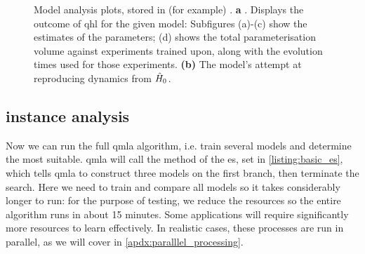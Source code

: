 \begin{figure}[H]
    \begin{center}
    \qquad
    \end{center}
    \caption[Model analysis plots]{
        Model analysis plots, stored in (for example) . 
        \textbf{a} . 
        Displays the outcome of \gls{qhl} for the given model:
        Subfigures (a)-(c) show the estimates of the parameters; 
        (d) shows the total parameterisation \gls{volume} against experiments trained upon, 
        along with the evolution times used for those experiments. 
        \textbf{(b)}  The model's attempt at reproducing dynamics from $\hat{H}_0$. 
    }
    \label{fig:model_analysis}
\end{figure}

\subsection{\Gls{instance} analysis}
Now we can run the full \gls{qmla} algorithm, i.e. train several models 
    and determine the most suitable. 
\gls{qmla} will call the  method of the  \gls{es},
    set in \cref{listing:basic_es}, which tells \gls{qmla} to construct three models
    on the first branch, then terminate the search.
Here we need to train and compare all models so it takes considerably longer to run:
    for the purpose of testing, we reduce the resources so the entire algorithm runs in about 15 minutes.
Some applications will require significantly more resources to learn effectively.
In realistic cases, these processes are run in parallel, as we will cover in \cref{apdx:paralllel_processing}.
\par 


